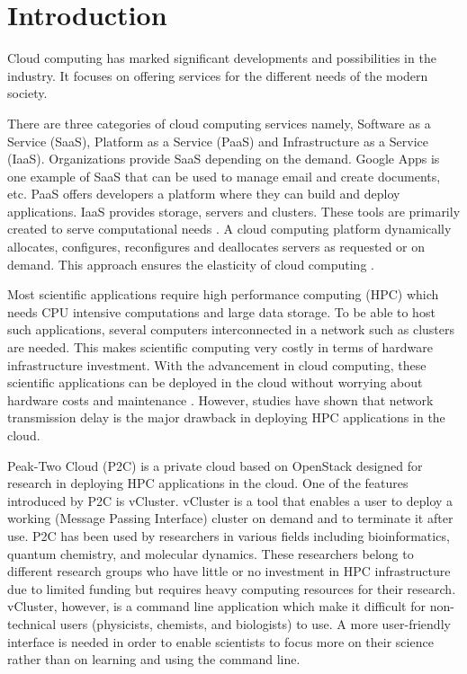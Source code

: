 \section{Introduction}

Cloud computing has marked significant developments and possibilities in the industry. It focuses on offering services for the different needs of the modern society.


There are three categories of cloud computing services namely, Software as a Service (SaaS), Platform as a Service (PaaS) and Infrastructure as a Service (IaaS). Organizations provide SaaS depending on the demand. Google Apps is one example of SaaS that can be used to manage email and create documents, etc. PaaS offers developers a platform where they can build and deploy applications. IaaS provides storage, servers and clusters. These tools are primarily created to serve computational needs \cite {Ahuja2012}. A cloud computing platform dynamically allocates, configures, reconfigures and deallocates servers as requested or on demand. This approach ensures the elasticity of cloud computing \cite {Brandic2011}.


Most scientific applications require high performance computing (HPC) which needs CPU intensive computations and large data storage. To be able to host such applications, several computers interconnected in a network such as clusters are needed. This makes scientific computing very costly in terms of hardware infrastructure investment. With the advancement in cloud computing, these scientific applications  can be deployed in the cloud without worrying about hardware costs and maintenance \cite {Ahuja2012}. However, studies have shown that network transmission delay is the major drawback in deploying HPC applications in the cloud\cite {Brandic2011}. 

Peak-Two Cloud (P2C) is a private cloud based on OpenStack designed for research in deploying HPC applications in the cloud\cite {Hermocilla2014}. One of the features introduced by P2C is vCluster. vCluster is a tool that enables a user to deploy a working (Message Passing Interface) cluster on demand and to terminate it after use. P2C has been used by researchers in various fields including bioinformatics, quantum chemistry, and molecular dynamics. These researchers belong to different research groups who have little or no investment in HPC infrastructure due to limited funding but requires heavy computing resources for their research. vCluster, however, is a command line application which make it difficult for non-technical users (physicists, chemists, and biologists) to use. A more user-friendly interface is needed in order to enable scientists to focus more on their science rather than on learning and using the command  line.

